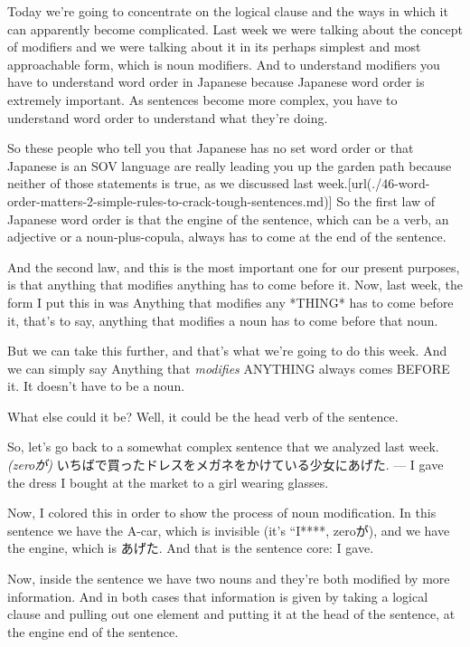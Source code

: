 Today we're going to concentrate on the logical clause and the ways in which it can apparently become complicated. Last week we were talking about the concept of modifiers and we were talking about it in its perhaps simplest and most approachable form, which is noun modifiers. And to understand modifiers you have to understand word order in Japanese because Japanese word order is extremely important. As sentences become more complex, you have to understand word order to understand what they're doing.

So these people who tell you that Japanese has no set word order or that Japanese is an SOV language are really leading you up the garden path because neither of those statements is true, as we discussed last week.\goto{{[}46{]}}[url(./46-word-order-matters-2-simple-rules-to-crack-tough-sentences.md)] So the first law of Japanese word order is that the engine of the sentence, which can be a verb, an adjective or a noun-plus-copula, always has to come at the end of the sentence.

{}

And the second law, and this is the most important one for our present purposes, is that anything that modifies anything has to come before it. Now, last week, the form I put this in was Anything that modifies any *THING* has to come before it, that's to say, anything that modifies a noun has to come before that noun.

But we can take this further, and that's what we're going to do this week. And we can simply say Anything that {\em modifies} ANYTHING always comes BEFORE it. It doesn't have to be a noun.

What else could it be? Well, it could be the head verb of the sentence.

So, let's go back to a somewhat complex sentence that we analyzed last week. {\em (zeroが)} いちばで買ったドレスをメガネをかけている少女にあげた. --- I gave the dress I bought at the market to a girl wearing glasses.

{}

Now, I colored this in order to show the process of noun modification. In this sentence we have the A-car, which is invisible (it's “I****, zeroが), and we have the engine, which is あげた. And that is the sentence core: I gave.

Now, inside the sentence we have two nouns and they're both modified by more information. And in both cases that information is given by taking a logical clause and pulling out one element and putting it at the head of the sentence, at the engine end of the sentence.

